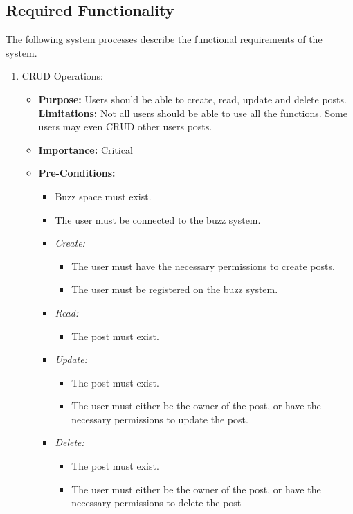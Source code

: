 \documentclass[11pt]{article}
\begin{document}
\subsection{Required Functionality}
The following system processes describe the functional requirements of the system.
\begin{enumerate}

\item CRUD Operations:
	\begin{itemize}
	\item \textbf{Purpose:}
	Users should be able to create, read, update and delete posts.
	\newline
	\textbf{Limitations:} Not all users should be able to use all the functions. Some users may even CRUD other users posts.
	\item \textbf{Importance: } Critical
	\item \textbf{Pre-Conditions: }
		\begin{itemize}
		\item Buzz space must exist.
		\item The user must be connected to the buzz system.\item 	
		
		\textit{Create: }
			\begin{itemize}
    			\item The user must have the necessary permissions to create posts.
    			\item The user must be registered on the buzz system.
  			\end{itemize}
  			
		\item \textit{Read: }
			\begin{itemize}
			\item The post must exist.
			\end{itemize}
	
		\item \textit{Update: }
			\begin{itemize}
			\item The post must exist.
			\item The user must either be the owner of the post, or have the necessary permissions to update the post.
			\end{itemize}

		\item \textit{Delete: }
			\begin{itemize}
			\item The post must exist.
			\item The user must either be the owner of the post, or have the necessary permissions to delete the post
			\end{itemize}  			
  			

\end{itemize}
\end{itemize}
\end{enumerate}
\end{document}
